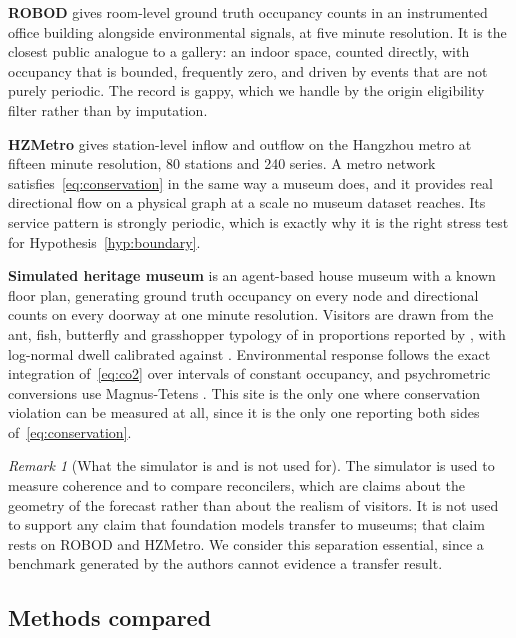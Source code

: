 \documentclass[11pt]{article}
\theoremstyle{plain}
\theoremstyle{definition}
\theoremstyle{remark}
\newtheorem{remark}[theorem]{Remark}
\begin{document}
\textbf{ROBOD} \citep{tekler2022robod} gives room-level ground truth occupancy counts in an instrumented office building alongside environmental signals, at five minute resolution. It is the closest public analogue to a gallery: an indoor space, counted directly, with occupancy that is bounded, frequently zero, and driven by events that are not purely periodic. The record is gappy, which we handle by the origin eligibility filter rather than by imputation.

\textbf{HZMetro} \citep{liu2022pvcgn} gives station-level inflow and outflow on the Hangzhou metro at fifteen minute resolution, \num{80} stations and \num{240} series. A metro network satisfies~\eqref{eq:conservation} in the same way a museum does, and it provides real directional flow on a physical graph at a scale no museum dataset reaches. Its service pattern is strongly periodic, which is exactly why it is the right stress test for Hypothesis~\ref{hyp:boundary}.

\textbf{Simulated heritage museum} is an agent-based house museum with a known floor plan, generating ground truth occupancy on every node and directional counts on every doorway at one minute resolution. Visitors are drawn from the ant, fish, butterfly and grasshopper typology of \citet{veron1983} in proportions reported by \citet{zancanaro2007}, with log-normal dwell calibrated against \citet{yoshimura2014louvre}. Environmental response follows the exact integration of~\eqref{eq:co2} over intervals of constant occupancy, and psychrometric conversions use Magnus-Tetens \citep{alduchov1996}. This site is the only one where conservation violation can be measured at all, since it is the only one reporting both sides of~\eqref{eq:conservation}.

\begin{remark}[What the simulator is and is not used for]
\label{rem:sim}
The simulator is used to measure coherence and to compare reconcilers, which are claims about the geometry of the forecast rather than about the realism of visitors. It is not used to support any claim that foundation models transfer to museums; that claim rests on ROBOD and HZMetro. We consider this separation essential, since a benchmark generated by the authors cannot evidence a transfer result.
\end{remark}

\subsection{Methods compared}
\end{document}
